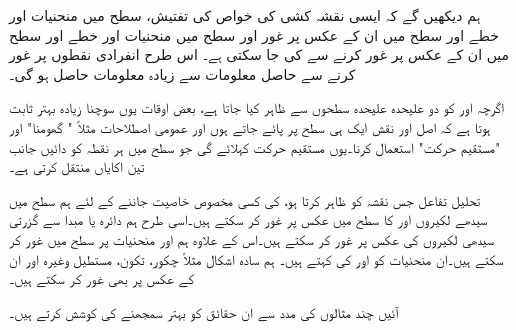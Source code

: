 ہم دیکھیں گے کہ ایسی نقشہ کشی کی خواص کی تفتیش،   سطح میں منحنیات اور خطے اور   سطح میں ان کے عکس پر غور اور  سطح میں منحنیات اور خطے اور   سطح میں ان کے عکس پر غور  کرنے سے  کی جا سکتی ہے۔ اس طرح  انفرادی نقطوں پر غور کرنے سے حاصل معلومات سے  زیادہ معلومات حاصل ہو گی۔

اگرچہ   اور  کو دو علیحدہ علیحدہ سطحوں سے ظاہر کیا جاتا ہے، بعض اوقات یوں  سوچنا زیادہ بہتر ثابت ہوتا ہے  کہ اصل اور نقش ایک ہی سطح پر پائے جاتے ہوں اور  عمومی اصطلاحات مثلاً " گھومنا" اور "مستقیم حرکت" استعمال کرنا۔یوں    مستقیم حرکت کہلائے گی جو  سطح میں ہر نقطہ کو دائیں جانب تین اکایاں منتقل کرتی ہے۔

تحلیل تفاعل  جس نقشہ کو ظاہر کرتا ہو، کی کسی مخصوص  خاصیت  جاننے کے لئے ہم  سطح میں سیدھے لکیروں  اور  کا  سطح میں عکس پر غور کر سکتے ہیں۔اسی طرح ہم دائرہ  یا مبدا سے گزرتی سیدھی لکیروں کی عکس پر غور کر سکتے ہیں۔اس کے علاوہ ہم  اور  منحنیات پر  سطح میں غور کر سکتے ہیں۔ان منحنیات کو  اور  کی  کہتے ہیں۔ ہم سادہ اشکال مثلاً چکور، تکون، مستطیل وغیرہ اور ان کے عکس پر بھی غور کر سکتے ہیں۔

آئیں چند مثالوں کی مدد سے ان حقائق کو بہتر سمجھنے کی کوشش کرتے ہیں۔

